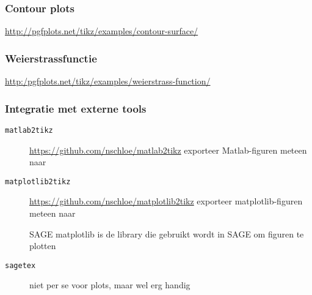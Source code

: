 \begin{frame}
  \frametitle{Contour plots}

  \centering
  

  \small\url{http://pgfplots.net/tikz/examples/contour-surface/}
\end{frame}

\begin{frame}
  \frametitle{Weierstrassfunctie}

  \centering
  

  \small\url{http:/pgfplots.net/tikz/examples/weierstrass-function/}
\end{frame}

\begin{frame}
  \frametitle{Integratie met externe tools}

  \begin{description}
    \item[\texttt{matlab2tikz}] \url{https://github.com/nschloe/matlab2tikz}
      exporteer Matlab-figuren meteen naar \TikZ
    \pause
    \item[\texttt{matplotlib2tikz}] \url{https://github.com/nschloe/matplotlib2tikz}
      exporteer matplotlib-figuren meteen naar \TikZ

      \begin{block}{SAGE}
        matplotlib is de library die gebruikt wordt in SAGE om figuren te plotten
      \end{block}
    \pause
    \item[\texttt{sagetex}] niet per se voor plots, maar wel erg handig
  \end{description}
\end{frame}

